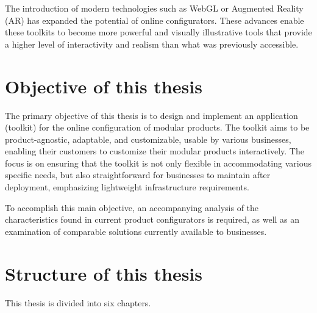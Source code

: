 The introduction of modern technologies such as WebGL or Augmented Reality (AR) has expanded the potential of online configurators. These advances enable these toolkits to become more powerful and visually illustrative tools that provide a higher level of interactivity and realism than what was previously accessible. \cite{Cozzi2015}

\section{Objective of this thesis}

The primary objective of this thesis is to design and implement an application (toolkit) for the online configuration of modular products. The toolkit aims to be product-agnostic, adaptable, and customizable, usable by various businesses, enabling their customers to customize their modular products interactively. The focus is on ensuring that the toolkit is not only flexible in accommodating various specific needs, but also straightforward for businesses to maintain after deployment, emphasizing lightweight infrastructure requirements. 

To accomplish this main objective, an accompanying analysis of the characteristics found in current product configurators is required, as well as an examination of comparable solutions currently available to businesses.

\section{Structure of this thesis}

This thesis is divided into six chapters.

